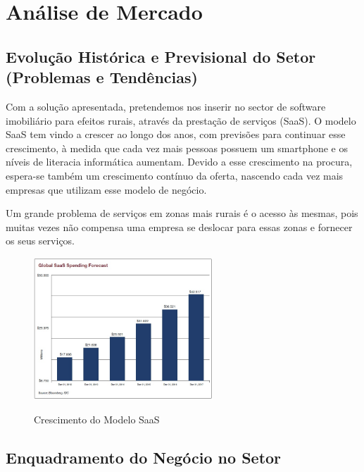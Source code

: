 \documentclass[11pt]{article}
\begin{document}
	\pagebreak
	
	\large
	\section{Análise de Mercado}
	
	\normalsize
	
	\large
	\subsection{Evolução Histórica e Previsional do Setor (Problemas e Tendências)}
	
	\normalsize
	
	Com a solução apresentada, pretendemos nos inserir no sector de software imobiliário para efeitos rurais, através da prestação de serviços (SaaS). O modelo SaaS tem vindo a crescer ao longo dos anos, com previsões para continuar esse crescimento, à medida que cada vez mais pessoas possuem um smartphone e os níveis de literacia informática aumentam. Devido a esse crescimento na procura, espera-se também um crescimento contínuo da oferta, nascendo cada vez mais empresas que utilizam esse modelo de negócio. 
	
	Um grande problema de serviços em zonas mais rurais é o acesso às mesmas, pois muitas vezes não compensa uma empresa se deslocar para essas zonas e fornecer os seus serviços.
	
	\begin{figure}[h]
		\includegraphics[width=0.6\textwidth,keepaspectratio]{crescimentoSaaS}
		\label{fig:crescimentoSaaS}
		\centering
		\caption{Crescimento do Modelo SaaS}
	\end{figure}
	
	
	
	\large
	\subsection{Enquadramento do Negócio no Setor}
	
\end{document}
